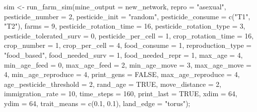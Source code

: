 \documentclass[
]{article}
\newenvironment{Shaded}{\begin{snugshade}}{\end{snugshade}}
\newcommand{\AttributeTok}[1]{\textcolor[rgb]{0.77,0.63,0.00}{#1}}
\newcommand{\ConstantTok}[1]{\textcolor[rgb]{0.00,0.00,0.00}{#1}}
\newcommand{\DecValTok}[1]{\textcolor[rgb]{0.00,0.00,0.81}{#1}}
\newcommand{\FloatTok}[1]{\textcolor[rgb]{0.00,0.00,0.81}{#1}}
\newcommand{\FunctionTok}[1]{\textcolor[rgb]{0.00,0.00,0.00}{#1}}
\newcommand{\NormalTok}[1]{#1}
\newcommand{\OtherTok}[1]{\textcolor[rgb]{0.56,0.35,0.01}{#1}}
\newcommand{\StringTok}[1]{\textcolor[rgb]{0.31,0.60,0.02}{#1}}
\begin{document}
\begin{Shaded}
\begin{Highlighting}[]
\NormalTok{sim }\OtherTok{\textless{}{-}} \FunctionTok{run\_farm\_sim}\NormalTok{(}\AttributeTok{mine\_output =}\NormalTok{ new\_network, }\AttributeTok{repro =} \StringTok{"asexual"}\NormalTok{, }
                    \AttributeTok{pesticide\_number =} \DecValTok{2}\NormalTok{, }\AttributeTok{pesticide\_init =} \StringTok{"random"}\NormalTok{, }
                    \AttributeTok{pesticide\_consume =} \FunctionTok{c}\NormalTok{(}\StringTok{"T1"}\NormalTok{, }\StringTok{"T2"}\NormalTok{), }\AttributeTok{farms =} \DecValTok{9}\NormalTok{,}
                    \AttributeTok{pesticide\_rotation\_time =} \DecValTok{16}\NormalTok{, }\AttributeTok{pesticide\_rotation\_type =} \DecValTok{3}\NormalTok{,}
                    \AttributeTok{pesticide\_tolerated\_surv =} \DecValTok{0}\NormalTok{, }\AttributeTok{pesticide\_per\_cell =} \DecValTok{1}\NormalTok{,}
                    \AttributeTok{crop\_rotation\_time =} \DecValTok{16}\NormalTok{, }\AttributeTok{crop\_number =} \DecValTok{1}\NormalTok{, }\AttributeTok{crop\_per\_cell =} \DecValTok{4}\NormalTok{, }
                    \AttributeTok{food\_consume =} \DecValTok{1}\NormalTok{, }\AttributeTok{reproduction\_type =} \StringTok{"food\_based"}\NormalTok{, }
                    \AttributeTok{food\_needed\_surv =} \DecValTok{1}\NormalTok{, }\AttributeTok{food\_needed\_repr =} \DecValTok{1}\NormalTok{, }\AttributeTok{max\_age =} \DecValTok{4}\NormalTok{, }
                    \AttributeTok{min\_age\_feed =} \DecValTok{0}\NormalTok{, }\AttributeTok{max\_age\_feed =} \DecValTok{2}\NormalTok{, }\AttributeTok{min\_age\_move =} \DecValTok{3}\NormalTok{, }
                    \AttributeTok{max\_age\_move =} \DecValTok{4}\NormalTok{, }\AttributeTok{min\_age\_reproduce =} \DecValTok{4}\NormalTok{, }\AttributeTok{print\_gens =} \ConstantTok{FALSE}\NormalTok{,}
                    \AttributeTok{max\_age\_reproduce =} \DecValTok{4}\NormalTok{, }\AttributeTok{age\_pesticide\_threshold =} \DecValTok{2}\NormalTok{, }
                    \AttributeTok{rand\_age =} \ConstantTok{TRUE}\NormalTok{, }\AttributeTok{move\_distance =} \DecValTok{2}\NormalTok{, }\AttributeTok{immigration\_rate =} \DecValTok{10}\NormalTok{, }
                    \AttributeTok{time\_steps =} \DecValTok{160}\NormalTok{, }\AttributeTok{print\_last =} \ConstantTok{TRUE}\NormalTok{, }\AttributeTok{xdim =} \DecValTok{64}\NormalTok{, }\AttributeTok{ydim =} \DecValTok{64}\NormalTok{,}
                    \AttributeTok{trait\_means =} \FunctionTok{c}\NormalTok{(}\FloatTok{0.1}\NormalTok{, }\FloatTok{0.1}\NormalTok{), }\AttributeTok{land\_edge =} \StringTok{"torus"}\NormalTok{);}
\end{Highlighting}
\end{Shaded}
\end{document}
